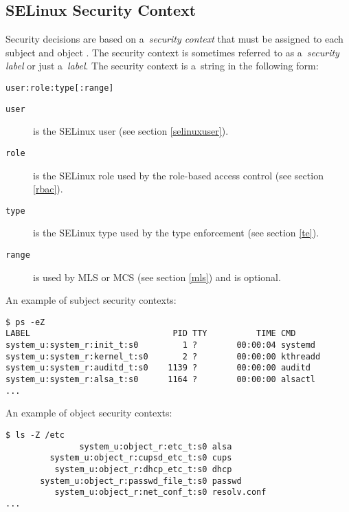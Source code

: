 \subsection{SELinux Security Context}
\label{context}
Security decisions are based on a~\emph{security context} that must be assigned
to each subject and object \cite[pp.~27--28]{tsn}. The security context is
sometimes referred to as a~\emph{security label} or just a~\emph{label}. The
security context is a~string in the following form:
\begin{lstlisting}
user:role:type[:range]
\end{lstlisting}
\begin{description}
    \item [\texttt{user}] is the SELinux user (see section \ref{selinuxuser}).
    \item [\texttt{role}] is the SELinux role used by the role-based access
        control (see section \ref{rbac}).
    \item [\texttt{type}] is the SELinux type used by the type enforcement (see
        section \ref{te}).
    \item [\texttt{range}] is used by MLS or MCS (see section \ref{mls}) and is
        optional.
\end{description}

\pagebreak

An example of subject security contexts:
\begin{lstlisting}
$ ps -eZ
LABEL                             PID TTY          TIME CMD
system_u:system_r:init_t:s0         1 ?        00:00:04 systemd
system_u:system_r:kernel_t:s0       2 ?        00:00:00 kthreadd
system_u:system_r:auditd_t:s0    1139 ?        00:00:00 auditd
system_u:system_r:alsa_t:s0      1164 ?        00:00:00 alsactl
...
\end{lstlisting}

An example of object security contexts:
\begin{lstlisting}
$ ls -Z /etc
               system_u:object_r:etc_t:s0 alsa
         system_u:object_r:cupsd_etc_t:s0 cups
          system_u:object_r:dhcp_etc_t:s0 dhcp
       system_u:object_r:passwd_file_t:s0 passwd
          system_u:object_r:net_conf_t:s0 resolv.conf
...
\end{lstlisting}

